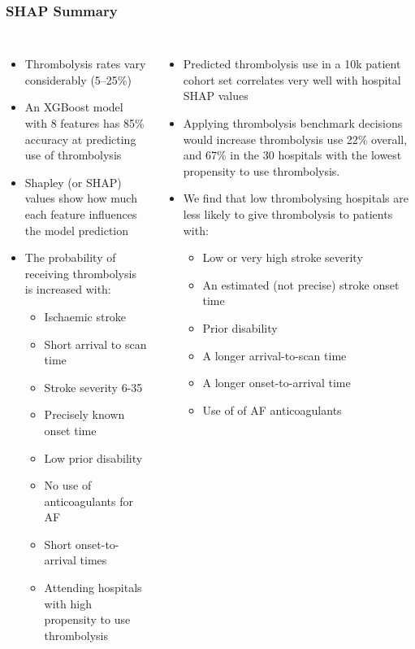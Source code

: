 \documentclass[xcolor={usenames,dvipsnames}]{beamer}
\begin{document}

\begin{frame}
\frametitle{SHAP Summary}

\begin{columns}
    \begin{itemize}
      \footnotesize 
      \item Thrombolysis rates vary considerably (5--25\%)
      \item An XGBoost model with 8 features has 85\% accuracy at predicting use of thrombolysis
      \item Shapley (or SHAP) values show how much each feature influences the model prediction
      \item The probability of receiving thrombolysis is increased with:
      \begin{itemize}
        \tiny 
        \item Ischaemic stroke
        \item Short arrival to scan time
        \item Stroke severity 6-35
        \item Precisely known onset time
        \item Low prior disability
        \item No use of anticoagulants for AF
        \item Short onset-to-arrival times
        \item Attending hospitals with high propensity to use thrombolysis
      \end{itemize}
    \end{itemize}

    \begin{itemize}
      \footnotesize 
      \item Predicted thrombolysis use in a 10k patient cohort set correlates very well with hospital SHAP values
      \item Applying thrombolysis benchmark decisions would increase thrombolysis use 22\% overall, and 67\% in the 30 hospitals with the lowest propensity to use thrombolysis.
      \item We find that low thrombolysing hospitals are less likely to give thrombolysis to patients with:
      \begin{itemize}
        \tiny 
        \item Low or very high stroke severity
        \item An estimated (not precise) stroke onset time
        \item Prior disability
        \item A longer arrival-to-scan time
        \item A longer onset-to-arrival time
        \item Use of of AF anticoagulants
      \end{itemize}
    \end{itemize}
\end{columns}

\end{frame}
\end{document}
